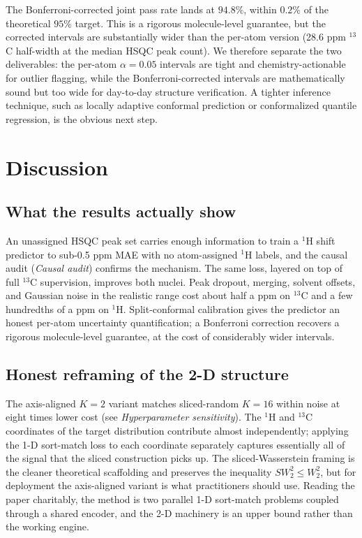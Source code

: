 \documentclass[
  11pt,
  a4paper,
]{article}
\begin{document}
The Bonferroni-corrected joint pass rate lands at \(94.8\%\), within
\(0.2\%\) of the theoretical \(95\%\) target. This is a rigorous
molecule-level guarantee, but the corrected intervals are substantially
wider than the per-atom version (28.6 ppm \(^{13}\)C half-width at the
median HSQC peak count). We therefore separate the two deliverables:
the per-atom \(\alpha = 0.05\) intervals are tight and
chemistry-actionable for outlier flagging, while the
Bonferroni-corrected intervals are mathematically sound but too wide
for day-to-day structure verification. A tighter inference technique,
such as locally adaptive conformal prediction or conformalized
quantile regression, is the obvious next step.

\section{Discussion}\label{discussion}

\subsection*{What the results actually show}

An unassigned HSQC peak set carries enough information to train a
\(^{1}\)H shift predictor to sub-0.5 ppm MAE with no atom-assigned
\(^{1}\)H labels, and the causal audit (\emph{Causal audit}) confirms the
mechanism. The same loss, layered on top of full \(^{13}\)C supervision,
improves both nuclei. Peak dropout, merging, solvent offsets, and
Gaussian noise in the realistic range cost about half a ppm on
\(^{13}\)C and a few hundredths of a ppm on \(^{1}\)H. Split-conformal
calibration gives the predictor an honest per-atom uncertainty
quantification; a Bonferroni correction recovers a rigorous
molecule-level guarantee, at the cost of considerably wider intervals.

\subsection*{Honest reframing of the 2-D structure}

The axis-aligned \(K = 2\) variant matches sliced-random \(K = 16\) within
noise at eight times lower cost (see \emph{Hyperparameter sensitivity}).
The \(^{1}\)H and
\(^{13}\)C coordinates of the target distribution contribute almost
independently; applying the 1-D sort-match loss to each coordinate
separately captures essentially all of the signal that the sliced
construction picks up. The sliced-Wasserstein framing is the cleaner
theoretical scaffolding and preserves the inequality
\(SW_{2}^{2} \leq W_{2}^{2}\), but for deployment the axis-aligned
variant is what practitioners should use. Reading the paper charitably,
the method is two parallel 1-D sort-match problems coupled through a
shared encoder, and the 2-D machinery is an upper bound rather than
the working engine.
\end{document}
